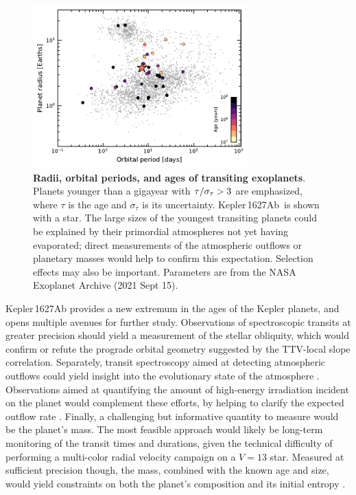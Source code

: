 \documentclass[12pt,modern,twocolumn,tighten]{aastex63}
\newcommand{\pn}{Kepler\,1627Ab} %
\begin{document}
\begin{figure}[tp]
	\begin{center}
		\leavevmode
		\includegraphics[width=0.74\textwidth]{f8.pdf}
	\end{center}
	\vspace{-0.7cm}
	\caption{
		{\bf Radii, orbital periods, and ages of transiting exoplanets}.
    Planets younger than a gigayear with ${\rm \tau}/\sigma_{\tau} >
    3$ are emphasized, where $\tau$ is the age and $\sigma_{\tau}$ is
    its uncertainty.  \pn\ is shown with a star.  The large sizes of
    the youngest transiting planets could be explained by their
    primordial atmospheres not yet having evaporated; direct
    measurements of the atmospheric outflows or planetary masses would
    help to confirm this expectation.  Selection effects may also be
    important.  Parameters are from the NASA Exoplanet Archive (2021
    Sept 15).
		\label{fig:rp_period_age}
	}
\end{figure}


Kepler\,1627Ab provides a new extremum in the ages of the Kepler
planets, and opens multiple avenues for further study.  Observations
of spectroscopic transits at greater precision should yield a
measurement of the stellar obliquity, which would confirm or refute
the prograde orbital geometry suggested by the TTV-local slope
correlation.  Separately, transit spectroscopy aimed at detecting
atmospheric outflows could yield insight into the evolutionary state
of the atmosphere \citep[{\it
e.g.},][]{ehrenreich_giant_2015,spake_helium_2018,vissapragada_2020}.
Observations aimed at quantifying the amount of high-energy
irradiation incident on the planet would complement these efforts, by
helping to clarify the expected outflow rate \citep[{\it
e.g.},][]{poppenhaeger_2021}.  Finally, a challenging but informative
quantity to measure would be the planet's mass.  The most feasible
approach would likely be long-term monitoring of the transit times and
durations, given the technical difficulty of performing a multi-color
radial velocity campaign on a $V=13$ star.  Measured at
sufficient precision though, the mass, combined with the known age and
size, would yield constraints on both the planet's composition and its
initial entropy \citep{owen_constraining_2020}.
\end{document}
